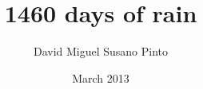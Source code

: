 \documentclass[a4paper,twoside,openright,draft]{memoir}
\author{David Miguel Susano Pinto}
\date{March 2013} %
\title{1460 days of rain} %
\begin{document}
  \frontmatter

  \maketitle

  \clearpage
  \tableofcontents
  \clearpage
  \listoffigures
  \clearpage
  \listoftables

  \clearpage
  \begin{abstract}  %

  \end{abstract}

  \mainmatter

  
  
  
  
  
  
  

  \backmatter

  
%  
\end{document}
